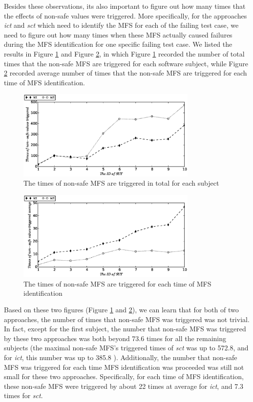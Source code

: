 \documentclass[10pt,journal,compsoc]{IEEEtran}
\begin{document}
{\color{blue}Besides these observations, its also important to figure out how many times that the effects of non-safe values were triggered. More specifically, for the approaches \emph{ict} and \emph{sct} which need to identify the MFS for each of the failing test case, we need to figure out how many times when these MFS actually caused failures during the MFS identification for one specific failing test case. We listed the results in Figure \ref{sen_safe_NonTrigger} and Figure \ref{sen_safe_NonTriggerAvg}, in which Figure \ref{sen_safe_NonTrigger} recorded the number of total times that the non-safe MFS are triggered for each software subject, while Figure \ref{sen_safe_NonTriggerAvg} recorded average number of times that the non-safe MFS are triggered for each time of MFS identification.

\begin{figure}[htbp]
 \includegraphics[width=3.5in]{enNonSafe.eps}
\caption{The times of non-safe MFS are triggered in total for each subject}
\label{sen_safe_NonTrigger}
\end{figure}


\begin{figure}[htbp]
 \includegraphics[width=3.5in]{enNonSafeTriggerAvg.eps}
\caption{The times of non-safe MFS are triggered for each time of MFS identification}
\label{sen_safe_NonTriggerAvg}
\end{figure}

Based on these two figures (Figure \ref{sen_safe_NonTrigger} and \ref{sen_safe_NonTriggerAvg}), we can learn that for both of two approaches, the number of times that non-safe MFS was triggered was not trivial. In fact, except for the first subject, the number that non-safe MFS was triggered by these two approaches was both beyond 73.6 times for all the remaining subjects (the maximal non-safe MFS's triggered times of \emph{sct} was up to 572.8, and for \emph{ict}, this number was up to 385.8 ). Additionally, the number that non-safe MFS was triggered for each time MFS identification was proceeded was still not small for these two approaches. Specifically, for each time of MFS identification, these non-safe MFS were  triggered by about 22 times at average for \emph{ict}, and 7.3 times for \emph{sct}.
}
\end{document}
